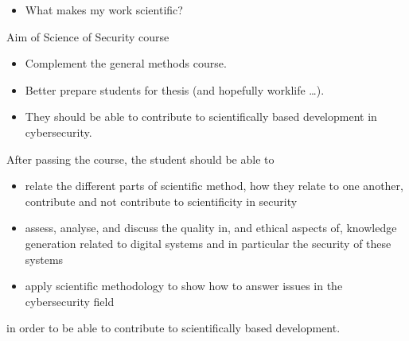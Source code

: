 \begin{frame}
  \begin{question}
    \begin{itemize}
      \item What makes my work scientific?
    \end{itemize}
  \end{question}
\end{frame}

\begin{frame}
  \begin{block}{Aim of Science of Security course}
    \begin{itemize}
      \item Complement the general methods course.
      \item Better prepare students for thesis (and hopefully worklife \dots).
      \item They should be able to contribute to scientifically based 
        development in cybersecurity.
    \end{itemize}
  \end{block}
\end{frame}

\begin{frame}[fragile]
  After passing the course, the student should be able to
  \begin{itemize}
    \item<+> relate the different parts of scientific method, how they relate 
      to one another, contribute and not contribute to scientificity in 
      security
    \item<+> assess, analyse, and discuss the quality in, and ethical aspects 
      of, knowledge generation related to digital systems and in particular the 
      security of these systems
    \item<+> apply scientific methodology to show how to answer issues in the 
      cybersecurity field
  \end{itemize}
  in order to be able to contribute to scientifically based development.
\end{frame}

